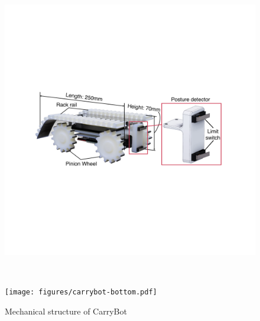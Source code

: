 \begin{figure}[tb]
  \begin{minipage}{\hsize}
  \centering
  \includegraphics[width=\columnwidth]{figures/carrybot-diagonal.pdf}
  \label{fig:diagonal}
 \end{minipage}\\
 \begin{minipage}{\hsize}
  \centering
  \texttt{[image: figures/carrybot-bottom.pdf]}
  \label{fig:bottom}
 \end{minipage}
 \caption{Mechanical structure of CarryBot}
 \label{fig:carrybot}
\end{figure}
